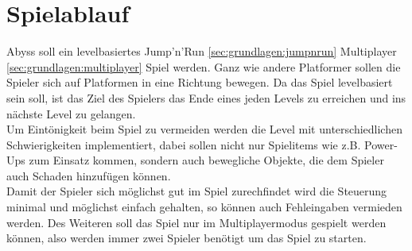 \section{Spielablauf}
\label{sec:grundlagen:spielgrundlagen}
Abyss soll ein levelbasiertes Jump'n'Run \ref{sec:grundlagen:jumpnrun} Multiplayer \ref{sec:grundlagen:multiplayer} Spiel werden. \newline
Ganz wie andere Platformer sollen die Spieler sich auf Platformen in eine Richtung bewegen. Da das Spiel levelbasiert sein soll, ist das Ziel des Spielers das Ende eines jeden Levels zu erreichen und ins nächste Level zu gelangen. \\
Um Eintönigkeit beim Spiel zu vermeiden werden die Level mit unterschiedlichen Schwierigkeiten implementiert, dabei sollen nicht nur Spielitems wie z.B. Power-Ups zum Einsatz kommen, sondern auch bewegliche Objekte, die dem Spieler auch Schaden hinzufügen können. \\
Damit der Spieler sich möglichst gut im Spiel zurechfindet wird die Steuerung minimal und möglichst einfach gehalten, so können auch Fehleingaben vermieden werden. Des Weiteren soll das Spiel nur im Multiplayermodus gespielt werden können, also werden immer zwei Spieler benötigt um das Spiel zu starten. 
